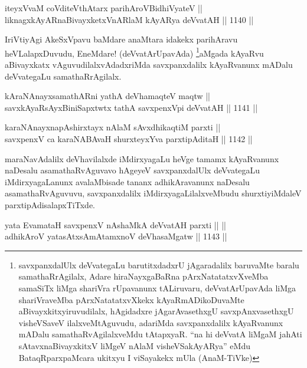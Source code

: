 \begin{shl}
iteyxVvaM coVditeV\s thAtarx parihAroV\s BidhiVyateV || \\
liknagxkAyARnaBivayxketxVnARlaM kAyARya deVvatAH \hfill || 1140 ||  
\end{shl}

\begin{artha}
IriVtiyAgi AkeSxVpavu baMdare anaMtara idakekx parihAravu heVLalapxDuvudu, EneMdare! (deVvatArUpavAda) \footnote{savxpanxdalUlx deVvategaLu barutitxdadxrU jAgaradalilx baruvaMte baralu samathaRrAgilalx, Adare hiraNayxgaBaRna pArxNatatatxvXveMba samaSiTx liMga shariVra rUpavanunx tALiruvaru, deVvatArUpavAda liMga shariVraveMba pArxNatatatxvXkekx kAyaRmADikoDuvaMte aBivayxkitxyiruvudilalx, hAgidadxre jAgarAvasethxgU savxpAnxvasethxgU visheVSaveV ilalxveMtAguvudu, adariMda savxpanxdalilx kAyaRvanunx mADalu samathaRvAgilalxveMdu tAtapxyaR. ``na hi deVvatA liMgaM jahAti sAtavxnaBivayxkitxV liMgeV nAlaM visheVSakAyARya'' eMdu BataqRparxpaMcara ukitxyu I viSayakekx mUla (AnaM-TiVke)}aMgada kAyaRvu aBivayxkatx vAguvudilalxvAdadxriMda savxpanxdalilx kAyaRvanunx mADalu deVvategaLu samathaRrAgilalx.
\end{artha}


\begin{shl}
kAraNAnayxsamathARni yathA deVhamaqteV maqtw || \\
savxkAyaRsAyxBiniSapxtwtx tathA savxpenxV\s pi deVvatAH \hfill || 1141 ||  
\end{shl}
				
\begin{shl}
karaNAnayxnapAshirxtayx nAlaM sAvxdhikaqtiM parxti ||  \\
savxpenxV ca karaNABAvaH shurxteyxYva parxtipAditaH \hfill || 1142 ||  
\end{shl}

\begin{artha}
maraNavAdalilx deVhavilalxde iMdirxyagaLu heVge tamamx kAyaRvanunx naDesalu asamathaRvAguvavo hAgeyeV savxpanxdalUlx deVvategaLu iMdirxyagaLanunx avalaMbisade tananx adhikAravanunx naDesalu asamathaRvAguvuvu, savxpanxdalilx iMdirxyagaLilalxveMbudu shurxtiyiMdaleV parxtipAdisalapxTiTxde.
\end{artha}

\begin{shl}
yata EvamataH savxpenxV nA\s \s shaMkA deVvatAH parxti ||  || \\
adhikAroV yatasAtxsAmAtamxnoV deVhasaMgatw \hfill || 1143 ||  
\end{shl}

